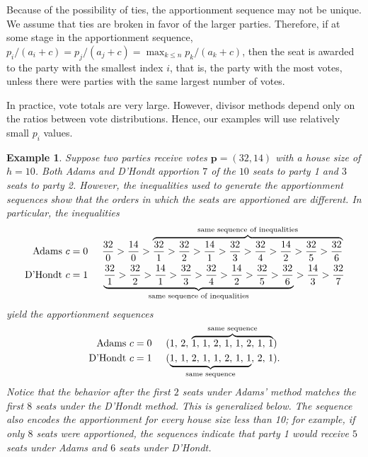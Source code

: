 \documentclass[pdflatex,sn-mathphys-num]{sn-jnl}
\theoremstyle{thmstyleone}%
\theoremstyle{thmstyletwo}%
\newtheorem{example}{Example}%
\theoremstyle{thmstylethree}%
\begin{document}
Because of the possibility of ties, the apportionment sequence may not be unique. We assume that ties are broken in favor of the larger parties. Therefore, if at some stage in the apportionment sequence, $p_i/(a_i+c)=p_j/(a_j+c) = \max_{k \le n}p_k/(a_k+c)$, then the seat is awarded to the party with the smallest index $i$, that is, the party with the most votes, unless there were parties with the same largest number of votes.

In practice, vote totals are very large. However, divisor methods depend only on the ratios between vote distributions. Hence, our examples will use relatively small $p_i$ values.

\begin{example}  \label{firstex}
Suppose  two parties receive votes $\mathbf p = (32, 14)$ with a house size of $h=10$.  Both Adams and D'Hondt apportion $7$ of the $10$ seats to party 1 and $3$ seats to party 2.  However, the inequalities used to generate the apportionment sequences show that the orders in which the seats are apportioned are different.  In particular, the inequalities
\begin{align*}
\text{Adams } c=0 \hskip 5mm & \frac{32}{0} > \frac{14}{0} > \overbrace{\frac{32}{1}> \frac{32}{2}> \frac{14}{1}> \frac{32}{3}> \frac{32}{4}> \frac{14}{2}> \frac{32}{5}> \frac{32}{6}}^{\text{same sequence of inequalities}} \\
\text{D'Hondt } c=1 \hskip 5mm & \underbrace{\frac{32}{1} > \frac{32}{2} > \frac{14}{1}> \frac{32}{3}> \frac{32}{4}> \frac{14}{2}> \frac{32}{5}> \frac{32}{6}}_{\text{same sequence of inequalities}} > \frac{14}{3}> \frac{32}{7} \end{align*}
yield the apportionment sequences
\begin{align*}
\text{Adams } c=0 \hskip 5mm & (1,\, 2,\, \overbrace{1, \, 1, \, 2, \, 1, \, 1, \, 2, \, 1, \, 1}^{\text{same sequence}}) \\
\text{D'Hondt } c=1 \hskip 5mm & (\underbrace{1, \, 1, \, 2, \, 1, \, 1, \, 2, \, 1, \, 1}_{\text{same sequence}}, \, 2, \, 1). \end{align*} Notice that the behavior after the first $2$ seats under Adams' method matches the first $8$ seats under the D'Hondt method.  This is generalized below.  The sequence also encodes the apportionment for every house size less than 10; for example, if only $8$ seats were apportioned, the sequences indicate that party 1 would receive $5$ seats under Adams and $6$ seats under D'Hondt. \end{example}
\end{document}
